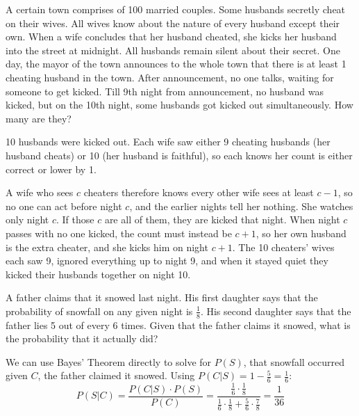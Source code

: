\begin{problem}
A certain town comprises of 100 married couples. Some husbands secretly cheat on their wives. All wives know about the nature of every husband except their own. When a wife concludes that her husband cheated, she kicks her husband into the street at midnight. All husbands remain silent about their secret. One day, the mayor of the town announces to the whole town that there is at least 1 cheating husband in the town. After announcement, no one talks, waiting for someone to get kicked. Till 9th night from announcement, no husband was kicked, but on the 10th night, some husbands got kicked out simultaneously. How many are they?
\end{problem}

\begin{solution}
10 husbands were kicked out. Each wife saw either 9 cheating husbands (her husband cheats) or 10 (her husband is faithful), so each knows her count is either correct or lower by 1.

A wife who sees $c$ cheaters therefore knows every other wife sees at least $c-1$, so no one can act before night $c$, and the earlier nights tell her nothing. She watches only night $c$. If those $c$ are all of them, they are kicked that night. When night $c$ passes with no one kicked, the count must instead be $c+1$, so her own husband is the extra cheater, and she kicks him on night $c+1$. The 10 cheaters' wives each saw 9, ignored everything up to night 9, and when it stayed quiet they kicked their husbands together on night 10.
\end{solution}

\newpage

\begin{problem}
A father claims that it snowed last night. His first daughter says that the probability of snowfall on any given night is $\frac{1}{8}$. His second daughter says that the father lies 5 out of every 6 times. Given that the father claims it snowed, what is the probability that it actually did?
\end{problem}

\begin{solution}
We can use Bayes' Theorem directly to solve for $P(S)$, that snowfall occurred given $C$, the father claimed it snowed. Using $P(C|S) = 1 - \frac{5}{6} = \frac{1}{6}$:
\[
P(S|C) = \frac{P(C|S)\cdot P(S)}{P(C)} =  \frac{\frac{1}{6} \cdot \frac{1}{8}}{\frac{1}{6} \cdot \frac{1}{8} + \frac{5}{6} \cdot \frac{7}{8}} = \frac{1}{36}
\]
\end{solution}


